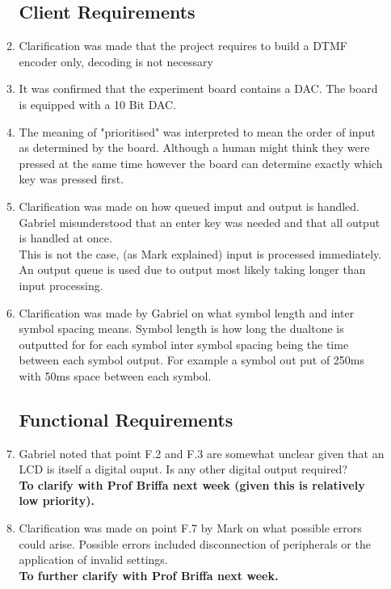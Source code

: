 \documentclass[11pt,a4paper]{scrartcl}
\begin{document}
\begin{enumerate}
\begin{enumerate}
      \subsection{Client Requirements}
      \item Clarification was made that the project requires to build a DTMF encoder only, decoding is not necessary
      \item It was confirmed that the experiment board contains a DAC. The board is equipped with a 10 Bit DAC.
      \item The meaning of "prioritised" was interpreted to mean the order of input as determined by the board. Although a human might think they were pressed at the same time
      however the board can determine exactly which key was pressed first.
      \item Clarification was made on how queued imput and output is handled. Gabriel misunderstood that an enter key was needed and that all output is handled at once.\\
      This is not the case, (as Mark explained) input is processed immediately. An output queue is used due to output most likely taking longer than input processing.
      \item Clarification was made by Gabriel on what symbol length and inter symbol spacing means. Symbol length is how long the dualtone is outputted for for each symbol
      inter symbol spacing being the time between each symbol output. For example a symbol out put of 250ms with 50ms space between each symbol.
      \subsection{Functional Requirements}
      \item Gabriel noted that point F.2 and F.3 are somewhat unclear given that an LCD is itself a digital ouput. Is any other digital output required?\\
      \textbf{To clarify with Prof Briffa next week (given this is relatively low priority).}
      \item Clarification was made on point F.7 by Mark on what possible errors could arise. Possible errors included disconnection of peripherals or the application of invalid settings.\\
      \textbf{To further clarify with Prof Briffa next week.}

\end{enumerate}
\end{enumerate}
\end{document}
